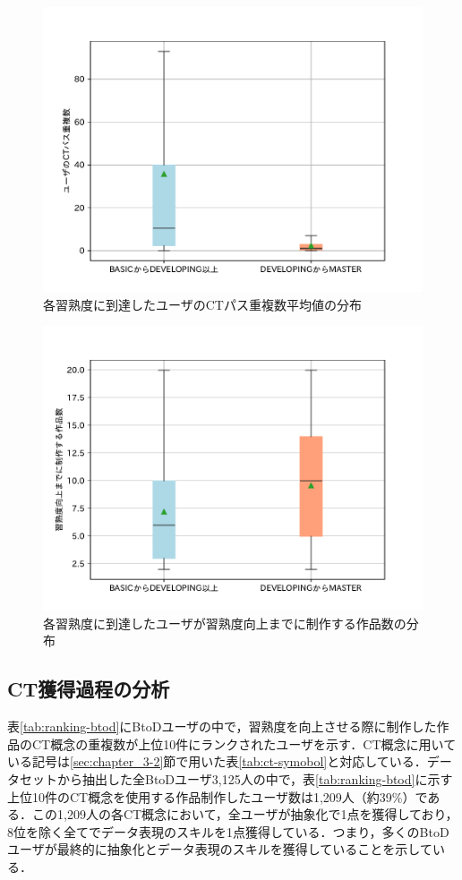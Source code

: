 \documentclass[submit,ses,noauthor]{ipsj}
\begin{document}
\begin{figure}[t]
	\centering
	\includegraphics[width=0.8\linewidth]{Okamoto_fig/dupli-all.pdf}
        \vspace{-5mm}
	\caption{各習熟度に到達したユーザのCTパス重複数平均値の分布}
	\label{fig:dupli-mean}
\end{figure}

\begin{figure}[t]
	\centering
	\includegraphics[width=0.8\linewidth]{Okamoto_fig/path-length.pdf}
        \vspace{-5mm}
	\caption{各習熟度に到達したユーザが習熟度向上までに制作する作品数の分布}
	\label{fig:path-length}
\end{figure}

\subsection{CT獲得過程の分析}\label{subsec:ct-analysis}

表\ref{tab:ranking-btod}にBtoDユーザの中で，習熟度を向上させる際に制作した作品のCT概念の重複数が上位10件にランクされたユーザを示す．CT概念に用いている記号は\ref{sec:chapter_3-2}節で用いた表\ref{tab:ct-symobol}と対応している．データセットから抽出した全BtoDユーザ3,125人の中で，表\ref{tab:ranking-btod}に示す上位10件のCT概念を使用する作品制作したユーザ数は1,209人（約39\%）である．この1,209人の各CT概念において，全ユーザが抽象化で1点を獲得しており，8位を除く全てでデータ表現のスキルを1点獲得している．つまり，多くのBtoDユーザが最終的に抽象化とデータ表現のスキルを獲得していることを示している．
\end{document}
